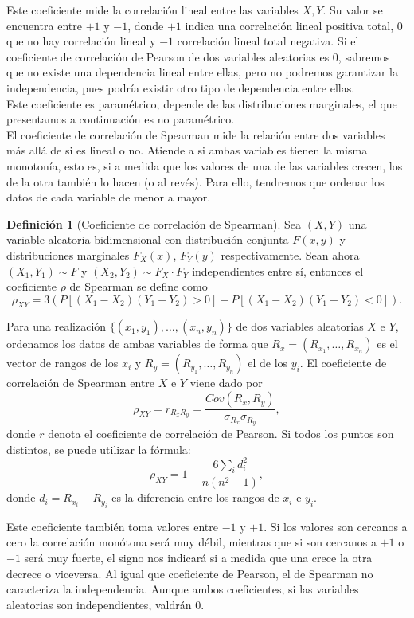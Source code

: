 \documentclass[12pt,a4paper]{report} %
\theoremstyle{definition}
\newtheorem{definition}{Definición}[section]
\begin{document}
Este coeficiente mide la correlación lineal entre las variables $X,Y$. Su valor se encuentra entre $+1$ y $-1$, donde $+1$ indica una correlación lineal positiva total, $0$ que no hay correlación lineal y $-1$ correlación lineal total negativa. Si el coeficiente de correlación de Pearson de dos variables aleatorias es $0$, sabremos que no existe una dependencia lineal entre ellas, pero no podremos garantizar la independencia, pues podría existir otro tipo de dependencia entre ellas.\\

Este coeficiente es paramétrico, depende de las distribuciones marginales, el que presentamos a continuación es no paramétrico.\\

El coeficiente de correlación de Spearman mide la relación entre dos variables más allá de si es lineal o no. Atiende a si ambas variables tienen la misma monotonía, esto es, si a medida que los valores de una de las variables crecen, los de la otra también lo hacen (o al revés). Para ello, tendremos que ordenar los datos de cada variable de menor a mayor.\\


\begin{definition}[Coeficiente de correlación de Spearman]
  Sea $(X,Y)$ una variable aleatoria bidimensional con distribución conjunta $F(x,y)$ y distribuciones marginales $F_X(x)$, $F_Y(y)$ respectivamente. Sean ahora $(X_1,Y_1)\sim F$ y $(X_2,Y_2)\sim F_X \cdot F_Y$ independientes entre sí, entonces el coeficiente $\rho$ de Spearman se define como\[
\rho_{XY} = 3\left ( P\left[(X_1-X_2)(Y_1-Y_2) > 0\right] -  P\left[(X_1-X_2)(Y_1-Y_2) < 0\right]\right).
  \]
  
  Para una realización $\{(x_1,y_1),\dots,(x_n,y_n)\}$ de dos variables aleatorias $X$ e $Y$, ordenamos los datos de ambas variables de forma que $R_x = (R_{x_1},\dots,R_{x_n})$ es el vector de rangos de los $x_i$ y $R_y = (R_{y_1},\dots,R_{y_n})$ el de los $y_i$. El coeficiente de correlación de Spearman entre $X$ e $Y$ viene dado por\[
\rho_{XY}=r_{R_xR_y}=\frac{Cov(R_x,R_y)}{\sigma_{R_x}\sigma_{R_y}},
\] donde $r$ denota el coeficiente de correlación de Pearson. Si todos los puntos son distintos, se puede utilizar la fórmula:\[
\rho_{XY} = 1 - \frac{6\sum_i d_i^2}{n(n^2-1)},
\]donde $d_i = R_{x_i}-R_{y_i}$ es la diferencia entre los rangos de $x_i$ e $y_i$.\\
\end{definition}

Este coeficiente también toma valores entre $-1$ y $+1$. Si los valores son cercanos a cero la correlación monótona será muy débil, mientras que si son cercanos a $+1$ o $-1$ será muy fuerte, el signo nos indicará si a medida que una crece la otra decrece o viceversa. Al igual que coeficiente de Pearson, el de Spearman no caracteriza la independencia. Aunque ambos coeficientes, si las variables aleatorias son independientes, valdrán $0$.\\
\end{document}
